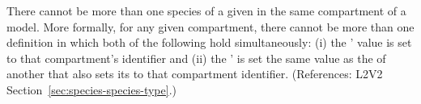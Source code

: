 There cannot be more than one species of a given \SpeciesType in the same
compartment of a model.  More formally, for any given compartment, there
cannot be more than one \Species definition in which both of the following
hold simultaneously: (i) the \Species'  value is set to
that compartment's identifier and (ii) the \Species'  is
set the same value as the  of another \Species that also
sets its  to that compartment identifier.  (References:
L2V2 Section~\ref{sec:species-species-type}.)
